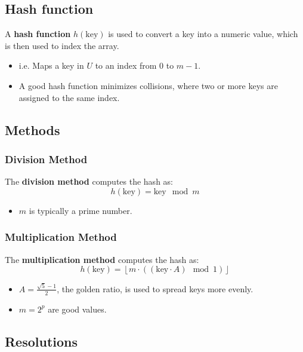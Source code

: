 \documentclass{article}
\begin{document}
\subsection{Hash function}
\begin{definition}
    A \textbf{hash function} \( h(\text{key}) \) is used to convert a key into a numeric value, which is then used to index the array. 
    \begin{itemize}
        \item i.e. Maps a key in $U$ to an index from $0$ to $m-1$.
        \item A good hash function minimizes collisions, where two or more keys are assigned to the same index.
    \end{itemize}
\end{definition}

\subsection{Methods}
\subsubsection{Division Method}
\begin{definition}
    The \textbf{division method} computes the hash as:
    \[
    h(\text{key}) = \text{key} \mod m
    \]
    \begin{itemize}
        \item \( m \) is typically a prime number. 
    \end{itemize}
\end{definition}

\subsubsection{Multiplication Method}
\begin{definition}
The \textbf{multiplication method} computes the hash as:
\[
h(\text{key}) = \left\lfloor m \cdot ((\text{key} \cdot A) \mod 1) \right\rfloor
\]
\begin{itemize}
    \item \( A = \frac{\sqrt{5} - 1}{2} \), the golden ratio, is used to spread keys more evenly. 
    \item $m = 2^p$ are good values.  
\end{itemize}
\end{definition}

\subsection{Resolutions}
\end{document}
